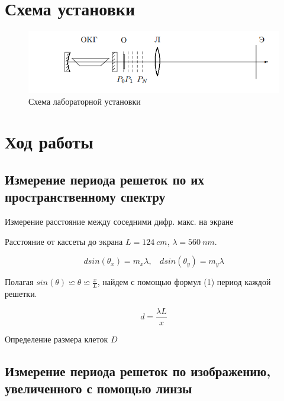 \documentclass[15pt,a5paper,reqno]{article}
\begin{document}
\section{Схема установки}

    \begin{figure}[h!]
    \centering
    \includegraphics[width=15cm]{pics/scheme.png}
    \caption{Схема лабораторной установки}
    \label{fig:vac}
\end{figure}

\section{Ход работы}


\subsection{Измерение периода решеток по их пространственному спектру}


\begin{table}[h!]
	\centering
	
	\caption{Измерение расстояние между соседними дифр. макс. на экране}
	\label{nu1}
\end{table}


Расстояние от кассеты до экрана $L = 124 \: cm$, $\lambda = 560 \: nm$.

\begin{equation}
    dsin(\theta_x) = m_x \lambda, \:\:\:\: d sin(\theta_y) = m_y \lambda     
  \label{first}
\end{equation}

Полагая $sin(\theta) \backsimeq \theta \backsimeq \frac{x}{L}$, найдем с помощью формул (1) период каждой решетки.

\[     d = \frac{\lambda L}{x}        \]

  

\begin{table}[h!]
	\centering
	
	\caption{Определение размера клеток $D$}
	\label{nu1}
\end{table}


\subsection{Измерение периода решеток по изображению, увеличенного с помощью линзы}
\end{document}
